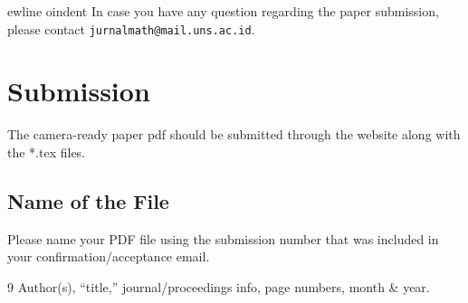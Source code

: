 \documentclass[12pt]{article}
\begin{document}
ewline
oindent
In case you have any question regarding the paper submission,
please contact  \verb+jurnalmath@mail.uns.ac.id+.

\section{Submission} \label{subm}
The camera-ready paper pdf should be submitted through the  website along with the *.tex files.

\subsection{Name of the File}
Please name your PDF file using the submission number that was included in your confirmation/acceptance email.

\begin{thebibliography}{9}
Author(s), ``title,'' journal/proceedings info, page numbers,
month \& year.
\end{thebibliography}
\end{document}
